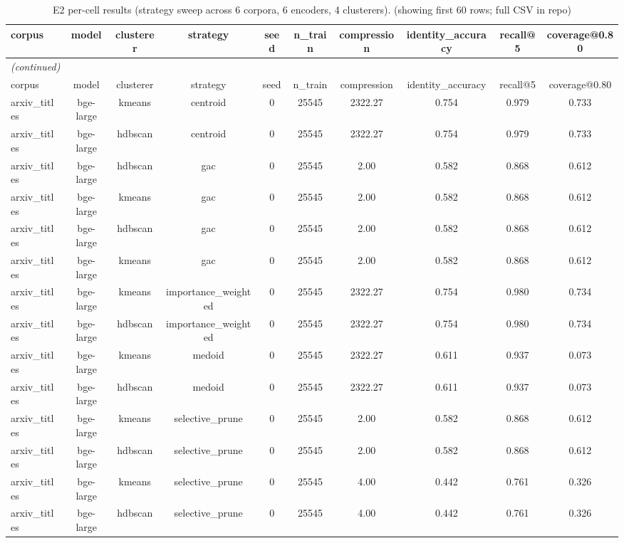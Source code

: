\begin{longtable}{lccccccccc}
\caption{E2 per-cell results (strategy sweep across 6 corpora, 6 encoders, 4 clusterers). (showing first 60 rows; full CSV in repo)}\label{tab:supp_e2}\\
\toprule
corpus & model & clusterer & strategy & seed & n\_train & compression & identity\_accuracy & recall@5 & coverage@0.80 \\
\midrule
\endfirsthead
\multicolumn{10}{l}{\small\itshape (continued)}\\
\toprule
corpus & model & clusterer & strategy & seed & n\_train & compression & identity\_accuracy & recall@5 & coverage@0.80 \\
\midrule
\endhead
\bottomrule
\endfoot
arxiv\_titles & bge-large & kmeans & centroid & 0 & 25545 & 2322.27 & 0.754 & 0.979 & 0.733 \\
arxiv\_titles & bge-large & hdbscan & centroid & 0 & 25545 & 2322.27 & 0.754 & 0.979 & 0.733 \\
arxiv\_titles & bge-large & hdbscan & gac & 0 & 25545 & 2.00 & 0.582 & 0.868 & 0.612 \\
arxiv\_titles & bge-large & kmeans & gac & 0 & 25545 & 2.00 & 0.582 & 0.868 & 0.612 \\
arxiv\_titles & bge-large & hdbscan & gac & 0 & 25545 & 2.00 & 0.582 & 0.868 & 0.612 \\
arxiv\_titles & bge-large & kmeans & gac & 0 & 25545 & 2.00 & 0.582 & 0.868 & 0.612 \\
arxiv\_titles & bge-large & kmeans & importance\_weighted & 0 & 25545 & 2322.27 & 0.754 & 0.980 & 0.734 \\
arxiv\_titles & bge-large & hdbscan & importance\_weighted & 0 & 25545 & 2322.27 & 0.754 & 0.980 & 0.734 \\
arxiv\_titles & bge-large & kmeans & medoid & 0 & 25545 & 2322.27 & 0.611 & 0.937 & 0.073 \\
arxiv\_titles & bge-large & hdbscan & medoid & 0 & 25545 & 2322.27 & 0.611 & 0.937 & 0.073 \\
arxiv\_titles & bge-large & kmeans & selective\_prune & 0 & 25545 & 2.00 & 0.582 & 0.868 & 0.612 \\
arxiv\_titles & bge-large & hdbscan & selective\_prune & 0 & 25545 & 2.00 & 0.582 & 0.868 & 0.612 \\
arxiv\_titles & bge-large & kmeans & selective\_prune & 0 & 25545 & 4.00 & 0.442 & 0.761 & 0.326 \\
arxiv\_titles & bge-large & hdbscan & selective\_prune & 0 & 25545 & 4.00 & 0.442 & 0.761 & 0.326 \\

\end{longtable}
